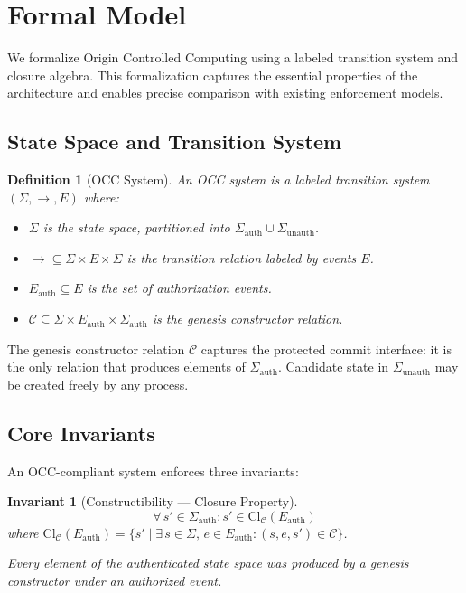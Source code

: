 \documentclass[11pt,letterpaper]{article}
\theoremstyle{occplain}
\newtheorem{definition}{Definition}[section]
\theoremstyle{occremark}
\newtheorem{invariant}{Invariant}[section]
\newcommand{\Sigauth}{\Sigma_{\mathrm{auth}}}
\newcommand{\Sigunauth}{\Sigma_{\mathrm{unauth}}}
\newcommand{\Eauth}{E_{\mathrm{auth}}}
\newcommand{\ClC}{\mathrm{Cl}_{\mathcal{C}}}
\begin{document}
\section{Formal Model}
\label{sec:formal}

We formalize Origin Controlled Computing using a labeled transition system and closure algebra. This formalization captures the essential properties of the architecture and enables precise comparison with existing enforcement models.


\subsection{State Space and Transition System}
\label{sec:state-space}

\begin{definition}[OCC System]
\label{def:occ-system}
An OCC system is a labeled transition system $(\Sigma, \rightarrow, E)$ where:
\begin{itemize}
  \item $\Sigma$ is the state space, partitioned into $\Sigauth \cup \Sigunauth$.
  \item ${\rightarrow} \subseteq \Sigma \times E \times \Sigma$ is the transition relation labeled by events $E$.
  \item $\Eauth \subseteq E$ is the set of authorization events.
  \item $\mathcal{C} \subseteq \Sigma \times \Eauth \times \Sigauth$ is the \emph{genesis constructor relation}.
\end{itemize}
\end{definition}

The genesis constructor relation $\mathcal{C}$ captures the protected commit interface: it is the only relation that produces elements of $\Sigauth$. Candidate state in $\Sigunauth$ may be created freely by any process.


\subsection{Core Invariants}
\label{sec:core-invariants}

An OCC-compliant system enforces three invariants:

\begin{invariant}[Constructibility --- Closure Property]
\label{inv:constructibility}
\[
  \forall\, s' \in \Sigauth : s' \in \ClC(\Eauth)
\]
where $\ClC(\Eauth) = \{ s' \mid \exists\, s \in \Sigma,\, e \in \Eauth : (s, e, s') \in \mathcal{C} \}$.

Every element of the authenticated state space was produced by a genesis constructor under an authorized event.
\end{invariant}
\end{document}
